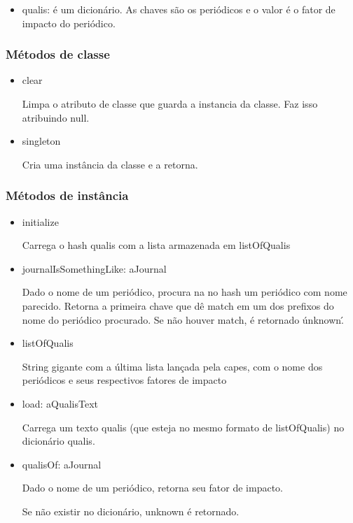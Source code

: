 \begin{itemize}
  \item qualis: é um dicionário. As chaves são os periódicos e o valor é o fator de impacto do periódico.
\end{itemize}

\subsubsection{Métodos de classe}

\begin{itemize}

  \item clear

  Limpa o atributo de classe que guarda a instancia da classe. Faz isso atribuindo null.

  \item singleton

  Cria uma instância da classe e a retorna.

\end{itemize}

\subsubsection{Métodos de instância}

\begin{itemize}

  \item initialize

  Carrega o hash qualis com a lista armazenada em listOfQualis

  \item journalIsSomethingLike: aJournal

  Dado o nome de um periódico, procura na no hash um periódico com nome parecido.
  Retorna a primeira chave que dê match em um dos prefixos do nome do periódico   procurado. Se não houver match, é retornado \'unknown\'.

  \item listOfQualis

  String gigante com a última lista lançada pela capes, com o nome dos periódicos e seus  respectivos fatores de impacto

  \item load: aQualisText

  Carrega um  texto qualis (que esteja no mesmo formato de listOfQualis) no dicionário  qualis.

  \item qualisOf: aJournal

  Dado o nome de um periódico, retorna seu fator de impacto.

  Se não existir no dicionário, unknown é retornado.

\end{itemize}

